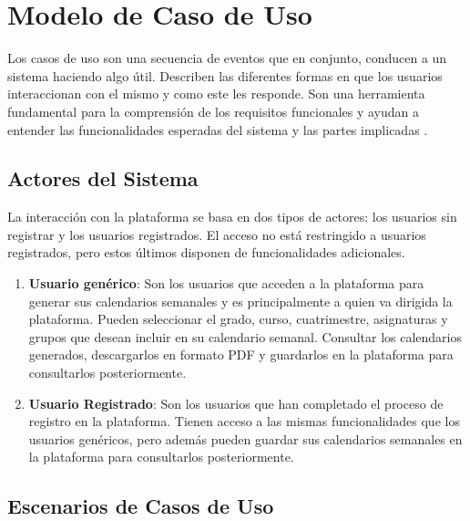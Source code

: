 \section{Modelo de Caso de Uso}

Los casos de uso son una secuencia de eventos que en conjunto, conducen a un sistema haciendo algo útil. Describen las diferentes formas en que los usuarios interaccionan con el mismo y como este les responde. Son una herramienta fundamental para la comprensión de los requisitos funcionales y ayudan a entender las funcionalidades esperadas del sistema y las partes implicadas \cite{bittner2003use}.

\subsection{Actores del Sistema}

La interacción con la plataforma se basa en dos tipos de actores: los usuarios sin registrar y los usuarios registrados. El acceso no está restringido a usuarios registrados, pero estos últimos disponen de funcionalidades adicionales.

\begin{enumerate}
    \item \textbf{Usuario genérico}: Son los usuarios que acceden a la plataforma para generar sus calendarios semanales y es principalmente a quien va dirigida la plataforma. Pueden seleccionar el grado, curso, cuatrimestre, asignaturas y grupos que desean incluir en su calendario semanal. Consultar los calendarios generados, descargarlos en formato PDF y guardarlos en la plataforma para consultarlos posteriormente.
    \item \textbf{Usuario Registrado}: Son los usuarios que han completado el proceso de registro en la plataforma. Tienen acceso a las mismas funcionalidades que los usuarios genéricos, pero además pueden guardar sus calendarios semanales en la plataforma para consultarlos posteriormente.
\end{enumerate}

\subsection{Escenarios de Casos de Uso}

\setcounter{ccCounter}{1}
\setlength{\textfloatsep}{5pt plus 1.0pt minus 2.0pt} %
\setlength{\floatsep}{5pt plus 1.0pt minus 2.0pt} %
\setlength{\intextsep}{5pt plus 1.0pt minus 2.0pt} %


